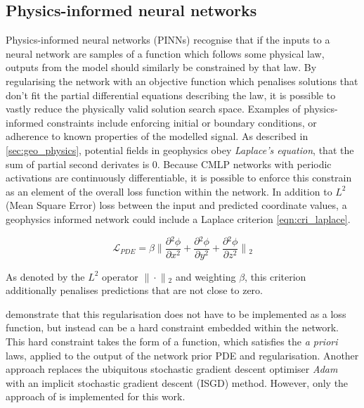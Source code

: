 \documentclass[manuscript.tex]{subfiles}
\begin{document}
\subsection{Physics-informed neural networks}
\label{sec:pinn}
Physics-informed neural networks (PINNs) recognise that if the inputs to a neural network are samples of a function which follows some physical law, outputs from the model should similarly be constrained by that law.
By regularising the network with an objective function which penalises solutions that don't fit the partial differential equations describing the law, it is possible to vastly reduce the physically valid solution search space.
Examples of physics-informed constraints include enforcing initial or boundary conditions, or adherence to known properties of the modelled signal.
As described in \cref{sec:geo_physics}, potential fields in geophysics obey \emph{Laplace's equation}, that the sum of partial second derivates is 0.
Because CMLP networks with periodic activations are continuously differentiable, it is possible to enforce this constrain as an element of the overall loss function within the network.
In addition to \(L^2\) (Mean Square Error) loss between the input and predicted coordinate values, a geophysics informed network could include a Laplace criterion \cref*{eqn:cri_laplace}.

\begin{equation}
    \label{eqn:cri_laplace}
    \mathcal{L}_{PDE} = \beta{}\lVert{}\frac{\partial{}^2\phi}{\partial{}x^2} + \frac{\partial{}^2\phi}{\partial{}y^2} + \frac{\partial{}^2\phi}{\partial{}z^2}\rVert{}_{2}
\end{equation}

As denoted by the \(L^2\) operator \(\lVert{}\cdot{}\rVert{}_{2}\) and weighting \(\beta{}\), this criterion additionally penalises predictions that are not close to zero.

\Textcite{sethiHardEnforcementPhysicsinformed2023} demonstrate that this regularisation does not have to be implemented as a loss function, but instead can be a hard constraint embedded within the network.
This hard constraint takes the form of a function, which satisfies the \emph{a priori} laws, applied to the output of the network prior PDE and regularisation.
Another approach \parencite{liImplicitStochasticGradient2023} replaces the ubiquitous stochastic gradient descent optimiser \emph{Adam} with an implicit stochastic gradient descent (ISGD) method.
However, only the approach of \textcite{benbarkaSeeingImplicitNeural2022} is implemented for this work.
\end{document}
